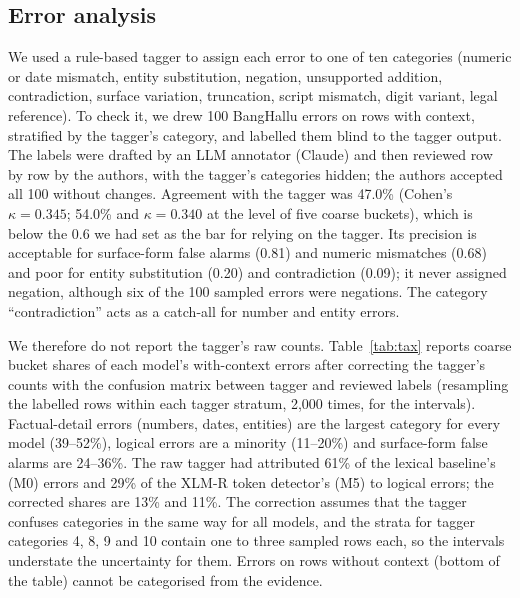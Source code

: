 \documentclass[manuscript,screen,review]{acmart}
\newcommand{\fit}[1]{\resizebox{\ifdim\width>\linewidth\linewidth\else\width\fi}{!}{#1}}
\begin{document}
\subsection{Error analysis}\label{sec:errors}
We used a rule-based tagger to assign each error to one of ten categories (numeric or date mismatch, entity substitution, negation, unsupported addition, contradiction, surface variation, truncation, script mismatch, digit variant, legal reference). To check it, we drew 100 BangHallu errors on rows with context, stratified by the tagger's category, and labelled them blind to the tagger output. The labels were drafted by an LLM annotator (Claude) and then reviewed row by row by the authors, with the tagger's categories hidden; the authors accepted all 100 without changes. Agreement with the tagger was 47.0\% (Cohen's $\kappa=0.345$; 54.0\% and $\kappa=0.340$ at the level of five coarse buckets), which is below the 0.6 we had set as the bar for relying on the tagger. Its precision is acceptable for surface-form false alarms (0.81) and numeric mismatches (0.68) and poor for entity substitution (0.20) and contradiction (0.09); it never assigned negation, although six of the 100 sampled errors were negations. The category ``contradiction'' acts as a catch-all for number and entity errors.

We therefore do not report the tagger's raw counts. Table~\ref{tab:tax} reports coarse bucket shares of each model's with-context errors after correcting the tagger's counts with the confusion matrix between tagger and reviewed labels (resampling the labelled rows within each tagger stratum, 2,000 times, for the intervals). Factual-detail errors (numbers, dates, entities) are the largest category for every model (39--52\%), logical errors are a minority (11--20\%) and surface-form false alarms are 24--36\%. The raw tagger had attributed 61\% of the lexical baseline's (M0) errors and 29\% of the XLM-R token detector's (M5) to logical errors; the corrected shares are 13\% and 11\%. The correction assumes that the tagger confuses categories in the same way for all models, and the strata for tagger categories 4, 8, 9 and 10 contain one to three sampled rows each, so the intervals understate the uncertainty for them. Errors on rows without context (bottom of the table) cannot be categorised from the evidence.

\begin{table}[t]
\caption{Corrected shares of with-context errors by coarse bucket (95\% bootstrap interval in brackets): factual-detail errors dominate for every model. The last two rows give the number of errors on rows with and without context.}
\label{tab:tax}
\small
\fit{}
\end{table}
\end{document}
